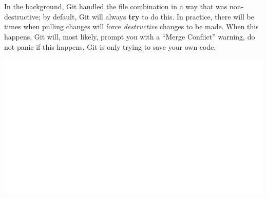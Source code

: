 \documentclass[12pt, letter]{article}
\begin{document}
    \\ \\
    In the background, Git handled the file combination in a way that was non-destructive; by default, Git will always \textbf{try} to do this. In practice, there will be times when pulling changes will force \emph{destructive} changes to be made. When this happens, Git will, most likely, prompt you with a ``Merge Conflict'' warning, do not panic if this happens, Git is only trying to save your own code.

    \includegraphics{screenshots/shot015.bmp}
\end{document}
